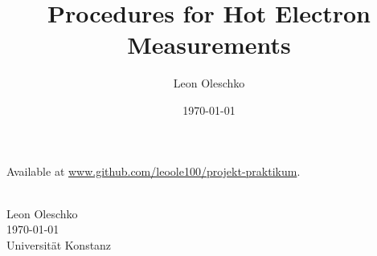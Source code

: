 \documentclass[
	parskip=half,
	a4paper,
]{scrarticle}
\begin{document}
\title{Procedures for Hot Electron Measurements}
\author{Leon Oleschko}
\date{\dotdate\today}
{
    \sffamily
	\begin{flushright}
        Available at \url{www.github.com/leoole100/projekt-praktikum}.
    \end{flushright}
    \vspace{.25cm}
    {
        \fontsize{24}{24}
    }
    \vspace{.25cm}\\
    {
        \normalsize
        Leon Oleschko\\
        \dotdate\today\\
        Universität Konstanz
    }
}



\end{document}
